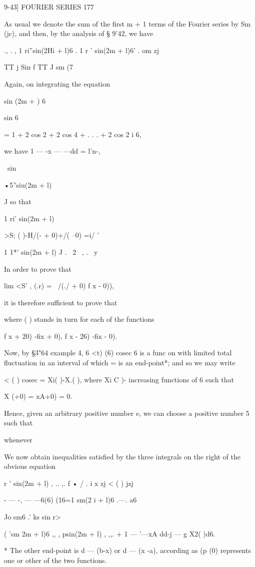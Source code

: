 9-43] FOURIER SERIES 177

As usual we denote the sum of the first m + 1 terms of the Fourier
series by Sm (jc), and then, by the analysis of § 9'42, we have

., . , 1 ri''sin(2Hi + l)6 . 1 r ' sin(2m + l)6' . om zj

TT j Sin f TT J sm (7

Again, on integrating the equation

sin (2m + ) 6

sin 6

= 1 + 2 cos 2 + 2 cos 4 + . . . + 2 cos 2 i 6,

we have 1 — -x — —dd = l'n-,

\ sin

•5''siu(2m + l)

J so that

1 ri' sin(2m + l)

>S; ( )-H/(- + 0)+/( --0) =i/ '

  1 1*' sin(2m + l) J . \ 2 \ , . \ y

In order to prove that

lim <S' , (.r) = \ /(./ + 0) f x - 0)),

it is therefore sufficient to prove that

where ( ) stands in turn for each of the functions

f x + 20) -fix + 0), f x - 26) -fix - 0).

Now, by §3"64 example 4, 6 <t) (6) cosec 6 is a func on with limited
total fluctuation in an interval of which = is an end-point*; and so
we may write

  < ( ) cosec = Xi( )-X.( ), where Xi C )- %
increasing functions of 6 such that

X (+0) = xA+0) = 0.

Hence, given an arbitrary positive number e, we can choose a positive
number 5 such that

whenever %

We now obtain inequalities satisfied by the three integrals on the
right of the obvious equation

r ' sin(2m + l) , .. ,. f • / . i x zj < ( ) jzj

 - — -, — —6(6) (16=1 sm(2 i + l)6 .—. a6

Jo sm6 .' ks sin r>

( 'sm 2m + l)6 ,, , psin(2m + l) , ,,. + 1 — '—xA dd-j — g X2( )d6.

* The other end-point is d — (b-x) or d — (x -a), according as (p (0)
represents one or other of the two functions.

